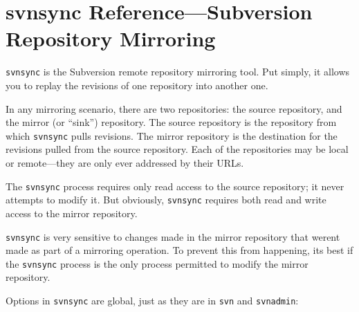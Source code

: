 \chapter{svnsync Reference---Subversion Repository
Mirroring}\label{svn.ref.svnsync}

\texttt{svnsync} is the Subversion remote repository mirroring tool. Put
simply, it allows you to replay the revisions of one repository into
another one.

In any mirroring scenario, there are two repositories: the source
repository, and the mirror (or ``sink'') repository. The source
repository is the repository from which \texttt{svnsync} pulls
revisions. The mirror repository is the destination for the revisions
pulled from the source repository. Each of the repositories may be local
or remote---they are only ever addressed by their URLs.

The \texttt{svnsync} process requires only read access to the source
repository; it never attempts to modify it. But obviously,
\texttt{svnsync} requires both read and write access to the mirror
repository.

\texttt{svnsync} is very sensitive to changes made in the mirror
repository that weren\textquotesingle t made as part of a mirroring
operation. To prevent this from happening, it\textquotesingle s best if
the \texttt{svnsync} process is the only process permitted to modify the
mirror repository.

Options in \texttt{svnsync} are global, just as they are in \texttt{svn}
and \texttt{svnadmin}:

\protect{}\label{svn.ref.svnsync.sw}{}

